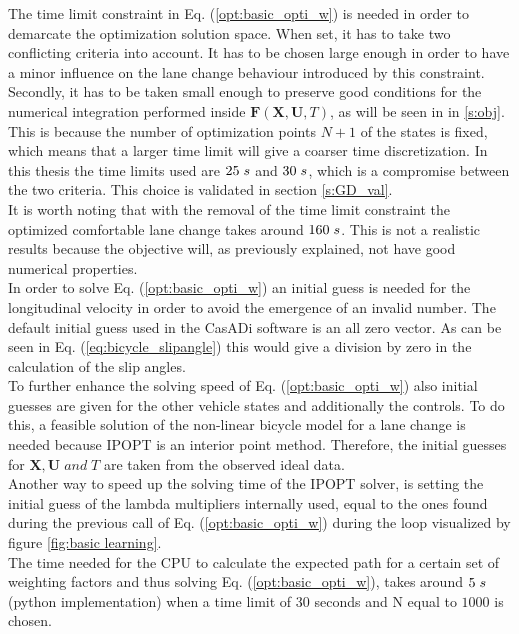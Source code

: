 The time limit constraint in Eq. (\ref{opt:basic_opti_w}) is needed in order to demarcate the optimization solution space. When set, it has to take two conflicting criteria into account. It has to be chosen large enough in order to have a minor influence on the lane change behaviour introduced by this constraint. Secondly, it has to be taken small enough to preserve good conditions for the numerical integration performed inside $\bm{F}(\bm{X},\bm{U}, T)$, as will be seen in in \ref{s:obj}. This is because the number of optimization points $N+1$ of the states is fixed, which means that a larger time limit will give a coarser time discretization. In this thesis the time limits used are $25\hspace{1mm}s$ and $30\hspace{1mm}s$, which is a compromise between the two criteria. This choice is validated in section \ref{s:GD_val}.\\It is worth noting that with the removal of the time limit constraint the optimized comfortable lane change takes around $160 \hspace{1mm}s$. This is not a realistic results because the objective will, as previously explained, not have good numerical properties.\\ 

In order to solve Eq. (\ref{opt:basic_opti_w}) an initial guess is needed for the longitudinal velocity in order to avoid the emergence of an invalid number. The default initial guess used in the CasADi software is an all zero vector. As can be seen in Eq. (\ref{eq:bicycle_slipangle}) this would give a division by zero in the calculation of the slip angles. \\
To further enhance the solving speed of Eq. (\ref{opt:basic_opti_w}) also initial guesses are given for the other vehicle states and additionally the controls. To do this, a feasible solution of the non-linear bicycle model for a lane change is needed because IPOPT is an interior point method. Therefore, the initial guesses for $\bm{X}, \bm{U} \;and\; T$ are taken from the observed ideal data. \\

Another way to speed up the solving time of the IPOPT solver, is setting the initial guess of the lambda multipliers internally used, equal to the ones found during the previous call of Eq. (\ref{opt:basic_opti_w}) during the loop visualized by figure \ref{fig:basic learning}. \\The time needed for the CPU to calculate the expected path for a certain set of weighting factors and thus solving Eq. (\ref{opt:basic_opti_w}), takes around $5\hspace{1mm}s$ (python implementation) when a time limit of $30$ seconds and N equal to $1000$ is chosen.\\

